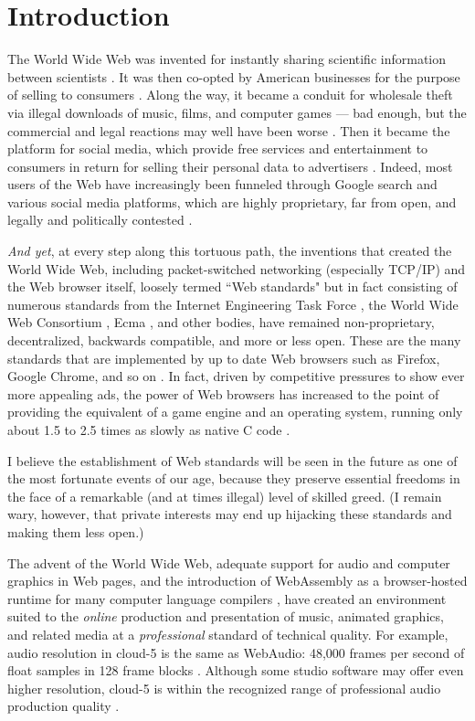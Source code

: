 \documentclass[runningheads,a4paper]{llncs}
\begin{document}
\section{Introduction}

The World Wide Web was invented for instantly sharing scientific information between scientists \cite{www}. It was then co-opted by American businesses for the purpose of selling to consumers \cite{gore}. Along the way, it became a conduit for wholesale theft via illegal downloads of music, films, and computer games --- bad enough, but the commercial and legal reactions may well have been worse \cite{freeculture}. Then it became the platform for social media, which provide free services and entertainment to consumers in return for selling their personal data to advertisers \cite{socialmedia}. Indeed, most users of the Web have increasingly been funneled through Google search and various social media platforms, which are highly proprietary, far from open, and legally and politically contested \cite{surveillance}. 

\emph{And yet}, at every step along this tortuous path, the inventions that created the World Wide Web, including packet-switched networking (especially TCP/IP) and the Web browser itself, loosely termed ``Web standards" but in fact consisting of numerous standards from the Internet Engineering Task Force \cite{ietf}, the World Wide Web Consortium \cite{w3c}, Ecma \cite{ecma}, and other bodies, have remained non-proprietary, decentralized, backwards compatible, and more or less open. These are the many standards that are implemented by up to date Web browsers such as Firefox, Google Chrome, and so on \cite{html5test}. In fact, driven by competitive pressures to show ever more appealing ads, the power of Web browsers has increased to the point of providing the equivalent of a game engine and an operating system, running only about 1.5 to 2.5  times as slowly as native C code \cite{wasmspeed}. 

I believe the establishment of Web standards will be seen in the future as one of the most fortunate events of our age, because they preserve essential freedoms in the face of a remarkable (and at times illegal) level of skilled greed. (I remain wary, however, that private interests may end up hijacking these standards and making them less open.)

The advent of the World Wide Web, adequate support for audio and computer graphics in Web pages, and the introduction 
of WebAssembly as a browser-hosted runtime for many computer language compilers \cite{wasmlanguages}, have created an environment suited to the \emph{online} production and presentation of music, animated graphics, and 
related media at a \emph{professional} standard of technical quality.  For example, audio resolution in cloud-5 is the same as WebAudio: 48,000 frames per second of float samples in 128 frame blocks \cite{webaudiostandard}. Although some studio software may offer even higher resolution, cloud-5 is within the recognized range of professional audio production quality \cite{katz} \cite{bassal}.
\end{document}
